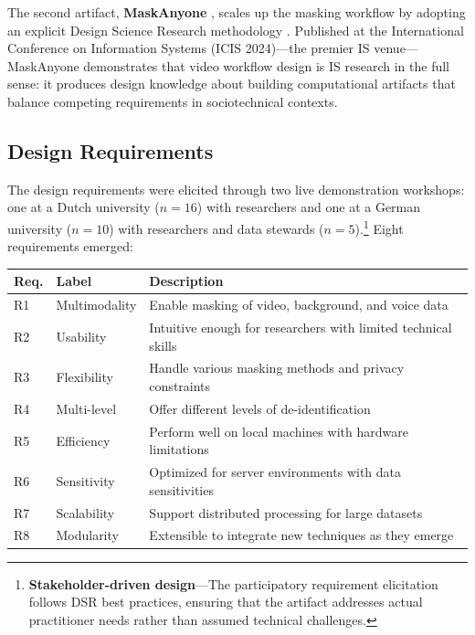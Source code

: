 \documentclass[../main.tex]{subfiles}
\begin{document}
The second artifact, \textbf{MaskAnyone} \parencite{owoyele2024maskanyone}, scales up the masking workflow by adopting an explicit Design Science Research methodology \parencite{hevner2004design}. Published at the International Conference on Information Systems (ICIS 2024)---the premier IS venue---MaskAnyone demonstrates that video workflow design is IS research in the full sense: it produces design knowledge about building computational artifacts that balance competing requirements in sociotechnical contexts.

\subsection{Design Requirements}

The design requirements were elicited through two live demonstration workshops: one at a Dutch university ($n = 16$) with researchers and one at a German university ($n = 10$) with researchers and data stewards ($n = 5$).\footnote{\textbf{Stakeholder-driven design}---The participatory requirement elicitation follows DSR best practices, ensuring that the artifact addresses actual practitioner needs rather than assumed technical challenges.} Eight requirements emerged:

\begin{center}
\small
\begin{tabular}{llp{7cm}}
\toprule
\textbf{Req.} & \textbf{Label} & \textbf{Description} \\
\midrule
R1 & Multimodality & Enable masking of video, background, and voice data \\
R2 & Usability & Intuitive enough for researchers with limited technical skills \\
R3 & Flexibility & Handle various masking methods and privacy constraints \\
R4 & Multi-level & Offer different levels of de-identification \\
R5 & Efficiency & Perform well on local machines with hardware limitations \\
R6 & Sensitivity & Optimized for server environments with data sensitivities \\
R7 & Scalability & Support distributed processing for large datasets \\
R8 & Modularity & Extensible to integrate new techniques as they emerge \\
\bottomrule
\end{tabular}
\end{center}
\end{document}
